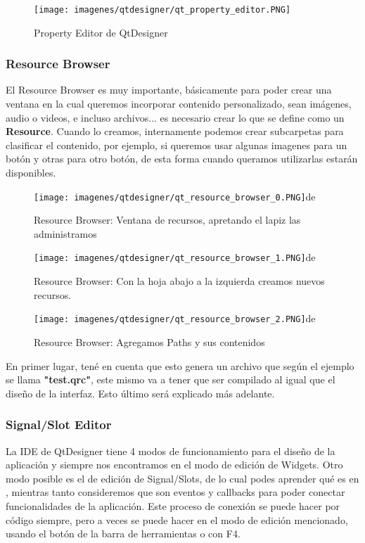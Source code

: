 \begin{figure}[H]
    \centering
    \texttt{[image: imagenes/qtdesigner/qt\_property\_editor.PNG]}
    \caption{Property Editor de QtDesigner}
    \label{fig:qt_property_editor}
\end{figure}

\subsubsection{Resource Browser}
El Resource Browser es muy importante, b\'asicamente para poder crear una ventana en la cual queremos incorporar contenido personalizado, sean im\'agenes,
audio o videos, e incluso archivos... es necesario crear lo que se define como un \textbf{Resource}. Cuando lo creamos, internamente podemos crear subcarpetas
para clasificar el contenido, por ejemplo, si queremos usar algunas imagenes para un bot\'on y otras para otro bot\'on, de esta forma cuando queramos utilizarlas estar\'an
disponibles.

\begin{figure}[H]
    \centering
    \texttt{[image: imagenes/qtdesigner/qt\_resource\_browser\_0.PNG]}de
    \caption{Resource Browser: Ventana de recursos, apretando el lapiz las administramos}
    \label{fig:qt_resources_0}
\end{figure}

\begin{figure}[H]
    \centering
    \texttt{[image: imagenes/qtdesigner/qt\_resource\_browser\_1.PNG]}de
    \caption{Resource Browser: Con la hoja abajo a la izquierda creamos nuevos recursos.}
    \label{fig:qt_resources_1}
\end{figure}

\begin{figure}[H]
    \centering
    \texttt{[image: imagenes/qtdesigner/qt\_resource\_browser\_2.PNG]}de
    \caption{Resource Browser: Agregamos Paths y sus contenidos}
    \label{fig:qt_resources_2}
\end{figure}

En primer lugar, ten\'e en cuenta que esto genera un archivo que seg\'un el ejemplo se llama \textbf{"test.qrc"}, este mismo
va a tener que ser compilado al igual que el dise\~no de la interfaz. Esto \'ultimo ser\'a explicado m\'as adelante.

\subsubsection{Signal/Slot Editor}
La IDE de QtDesigner tiene 4 modos de funcionamiento para el dise\~no de la aplicaci\'on y siempre nos encontramos en el modo
de edici\'on de Widgets. Otro modo posible es el de edici\'on de Signal/Slots, de lo cual podes aprender qu\'e es en ,
mientras tanto consideremos que son eventos y callbacks para poder conectar funcionalidades de la aplicaci\'on. Este proceso de conexi\'on se puede hacer por c\'odigo
siempre, pero a veces se puede hacer en el modo de edici\'on mencionado, usando el bot\'on de la barra de herramientas o con F4.

